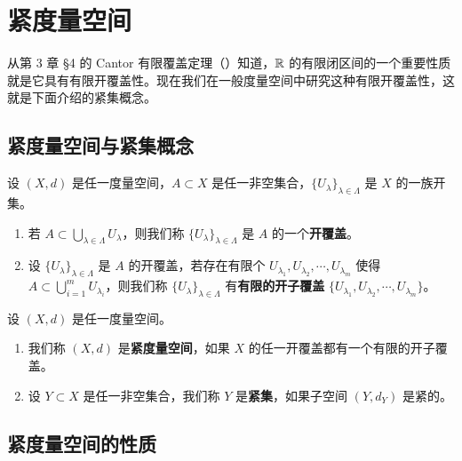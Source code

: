 \section{紧度量空间}

从第 3 章 §4 的 Cantor 有限覆盖定理（）知道，$\mathbb{R}$ 的有限闭区间的一个重要性质就是它具有有限开覆盖性。现在我们在一般度量空间中研究这种有限开覆盖性，这就是下面介绍的紧集概念。

\subsection{紧度量空间与紧集概念}
	\label{sec:10-5-1}

\begin{mydef*}{}

设 $(X,d)$ 是任一度量空间，$A\subset X$ 是任一非空集合，$\{U_{\lambda}\}_{\lambda\in\Lambda}$ 是 $X$ 的一族开集。

\begin{enumerate}[label=\arabic{enumi})]
\item 若 $A\subset\displaystyle\bigcup_{\lambda\in\Lambda}U_{\lambda}$，则我们称 $\{U_{\lambda}\}_{\lambda\in\Lambda}$ 是 $A$ 的一个\textbf{开覆盖}。
\item 设 $\{U_{\lambda}\}_{\lambda\in\Lambda}$ 是 $A$ 的开覆盖，若存在有限个 $U_{\lambda_1},U_{\lambda_2},\cdots,U_{\lambda_m}$ 使得 $A\subset\displaystyle\bigcup_{i=1}^{m}U_{\lambda_i}$，则我们称 $\{U_{\lambda}\}_{\lambda\in\Lambda}$ 有\textbf{有限的开子覆盖} $\{U_{\lambda_1},U_{\lambda_2},\cdots,U_{\lambda_m}\}$。
\end{enumerate}

\end{mydef*}

\begin{mydef*}{}

设 $(X,d)$ 是任一度量空间。

\begin{enumerate}[label=\arabic{enumi})]
\item 我们称 $(X,d)$ 是\textbf{紧度量空间}，如果 $X$ 的任一开覆盖都有一个有限的开子覆盖。
\item 设 $Y\subset X$ 是任一非空集合，我们称 $Y$ 是\textbf{紧集}，如果子空间 $(Y,d_Y)$ 是紧的。
\end{enumerate}

\end{mydef*}

\subsection{紧度量空间的性质}

